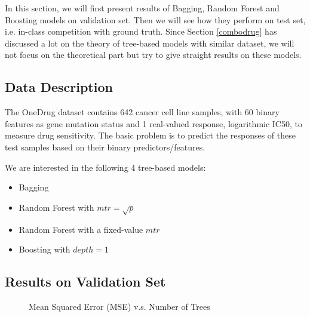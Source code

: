 \documentclass{article}
\begin{document}
In this section, we will first present results of Bagging, Random Forest and Boosting models on validation set. Then we will see how they perform on test set, i.e. in-class competition with ground truth. Since Section \ref{combodrug} has discussed a lot on the theory of tree-based models with similar dataset, we will not focus on the theoretical part but try to give straight results on these models. 
 
\subsection{Data Description}
The OneDrug dataset contains 642 cancer cell line samples, with 60 binary features as gene mutation status and 1 real-valued response, logarithmic IC50, to measure drug sensitivity. The basic problem is to predict the responses of these test samples based on their binary predictors/features.

We are interested in the following 4 tree-based models:
\begin{itemize}
	\item Bagging
	\item Random Forest with $mtr = \sqrt{p}$ 
	\item Random Forest with a fixed-value $mtr$
	\item Boosting with $depth = 1$
\end{itemize}

\subsection{Results on Validation Set}
\begin{figure}[h]
	\centering
	\caption{Mean Squared Error (MSE) v.s. Number of Trees}
\end{figure}
\end{document}
